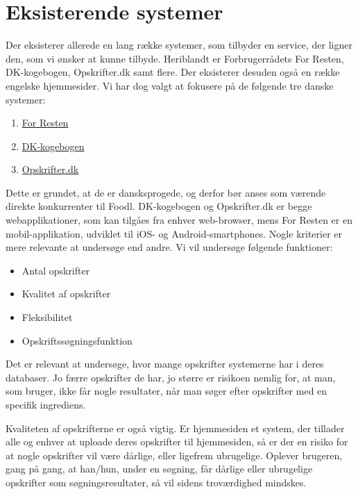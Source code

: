 \section{Eksisterende systemer}
\label{sec:eksisterendesystemer}

Der eksisterer allerede en lang række systemer, som tilbyder en service, der ligner den, som vi ønsker at kunne tilbyde. Heriblandt er Forbrugerrådets For Resten, DK-kogebogen, Opskrifter.dk samt flere. Der eksisterer desuden også en række engelske hjemmesider. Vi har dog valgt at fokusere på de følgende tre danske systemer: 

\begin{enumerate}[noitemsep]
  \item \href{https://play.google.com/store/apps/details?id=com.nodes.forresten}{For Resten} \cite{forresten}
  \item \href{http://www.dk-kogebogen.dk/}{DK-kogebogen} \cite{dkkogebogen}
  \item \href{http://opskrifter.dk/}{Opskrifter.dk} \cite{opskrifterdk}
\end{enumerate}

Dette er grundet, at de er dansksprogede, og derfor bør anses som værende direkte konkurrenter til Foodl. DK-kogebogen og Opskrifter.dk er begge webapplikationer, som kan tilgåes fra enhver web-browser, mens For Resten er en mobil-applikation, udviklet til iOS- og Android-smartphones. Nogle kriterier er mere relevante at undersøge end andre. Vi vil undersøge følgende funktioner:

\begin{itemize}[noitemsep]
  \item Antal opskrifter
  \item Kvalitet af opskrifter
  \item Fleksibilitet
  \item Opskriftssøgningsfunktion
\end{itemize}

Det er relevant at undersøge, hvor mange opskrifter systemerne har i deres databaser. Jo færre opskrifter de har, jo større er risikoen nemlig for, at man, som bruger, ikke får nogle resultater, når man søger efter opskrifter med en specifik ingrediens. 

Kvaliteten af opskrifterne er også vigtig. Er hjemmesiden \fx et system, der tillader alle og enhver at uploade deres opskrifter til hjemmesiden, så er der en risiko for at nogle opskrifter vil være dårlige, eller ligefrem ubrugelige. Oplever brugeren, gang på gang, at han/hun, under en søgning, får dårlige eller ubrugelige opskrifter som søgningsresultater, så vil sidens troværdighed mindskes. 

